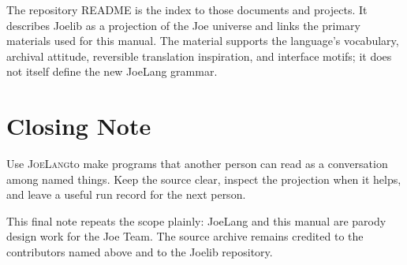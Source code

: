 \documentclass[12pt]{article}
\newcommand{\JoeLang}{\textsc{JoeLang}}
\begin{document}
The repository README is the index to those documents and projects. It describes Joelib as a projection of the Joe universe and links the primary materials used for this manual.\cite{joelibReadme} The material supports the language's vocabulary, archival attitude, reversible translation inspiration, and interface motifs; it does not itself define the new JoeLang grammar.

\clearpage
\section{Closing Note}
Use \JoeLang to make programs that another person can read as a conversation among named things. Keep the source clear, inspect the projection when it helps, and leave a useful run record for the next person.

This final note repeats the scope plainly: JoeLang and this manual are parody design work for the Joe Team. The source archive remains credited to the contributors named above and to the Joelib repository.
\end{document}
